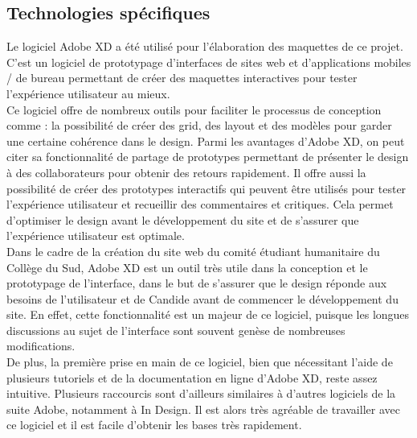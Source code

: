 \documentclass[a4,10pt,french]{sphinxmanual}
\begin{document}
\subsection{Technologies spécifiques}
\label{\detokenize{chapitre-02:technologies-specifiques}}
\sphinxAtStartPar
Le logiciel Adobe XD a été utilisé pour l’élaboration des maquettes de ce projet. C’est un logiciel de prototypage d’interfaces de sites web et d’applications mobiles / de bureau permettant de créer des maquettes interactives pour tester l’expérience utilisateur au mieux.\\
Ce logiciel offre de nombreux outils pour faciliter le processus de conception comme : la possibilité de créer des grid, des layout et des modèles pour garder une certaine cohérence dans le design. Parmi les avantages d’Adobe XD, on peut citer sa fonctionnalité de partage de prototypes permettant de présenter le design à des collaborateurs pour obtenir des retours rapidement. Il offre aussi la possibilité de créer des prototypes interactifs qui peuvent être utilisés pour tester l’expérience utilisateur et recueillir des commentaires et critiques. Cela permet d’optimiser le design avant le développement du site et de s’assurer que l’expérience utilisateur est optimale.\\
Dans le cadre de la création du site web du comité étudiant humanitaire du Collège du Sud, Adobe XD est un outil très utile dans la conception et le prototypage de l’interface, dans le but de s’assurer que le design réponde aux besoins de l’utilisateur et de Candide avant de commencer le développement du site. En effet, cette fonctionnalité est un majeur de ce logiciel, puisque les longues discussions au sujet de l’interface sont souvent genèse de nombreuses modifications.\\
De plus, la première prise en main de ce logiciel, bien que nécessitant l’aide de plusieurs tutoriels et de la documentation en ligne d’Adobe XD, reste assez intuitive. Plusieurs raccourcis sont d’ailleurs similaires à d’autres logiciels de la suite Adobe, notamment à In Design. Il est alors très agréable de travailler avec ce logiciel et il est facile d’obtenir les bases très rapidement.
\end{document}
